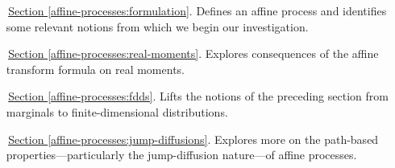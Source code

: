 \begin{enumerate}[leftmargin=24mm]
  \item[\,{\hyperref[affine-processes:formulation]{Section }}\ref{affine-processes:formulation}.]
    Defines an affine process and identifies some relevant notions from which we begin our investigation.
  \item[\,{\hyperref[affine-processes:real-moments]{Section }}\ref{affine-processes:real-moments}.]
    Explores consequences of the affine transform formula on real moments.
  \item[\,{\hyperref[affine-processes:fdds]{Section }}\ref{affine-processes:fdds}.]
    Lifts the notions of the preceding section from marginals to finite-dimensional distributions.
  \item[\,{\hyperref[affine-processes:jump-diffusions]{Section }}\ref{affine-processes:jump-diffusions}.]
    Explores more on the path-based properties---particularly the jump-diffusion nature---of affine processes.
\end{enumerate}

